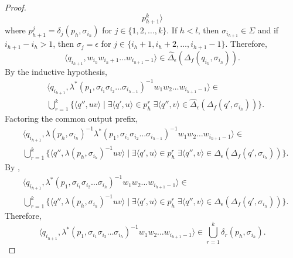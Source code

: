 \begin{proof}
\begin{equation*}
    p_{h+1}^k \rangle
  \end{equation*}
  where $p_{h+1}^j = \delta_j(p_h, \sigma_{i_h})$ for $j \in \{ 1, 2, \ldots, k \}$.
  If $h < l$, then $\sigma_{i_{h+1}} \in \Sigma$ and if $i_{h+1} - i_h > 1$, then
  $\sigma_j = \epsilon$ for $j \in \{ i_h+1, i_h+2, \ldots, i_{h+1}-1 \}$.
  Therefore,
  \begin{equation*}
    \langle q_{i_{h+1}}, w_{i_h} w_{i_h+1} \ldots w_{i_{h+1}-1} \rangle \in
    \hat{\Delta}_\epsilon(\Delta_f(q_{i_h}, \sigma_{i_h})).
  \end{equation*}
  By the inductive hypothesis,
  \begin{align*}
    &\langle q_{i_{h+1}}, \lambda^*(p_1, \sigma_{i_1} \sigma_{i_2} \ldots
    \sigma_{i_{h-1}})^{-1} w_1 w_2 \ldots w_{i_{h+1}-1} \rangle \in\\
    &\bigcup_{r=1}^k \{ \langle q'', uv \rangle \mid \exists \langle q', u \rangle
    \in p_h^r \; \exists \langle q'', v \rangle \in
    \hat{\Delta}_\epsilon(\Delta_f(q', \sigma_{i_h})) \}.
  \end{align*}
  Factoring the common output prefix,
  \begin{align*}
    &\langle q_{i_{h+1}}, \lambda(p_h, \sigma_{i_h})^{-1} \lambda^*(p_1,
    \sigma_{i_1} \sigma_{i_2} \ldots
    \sigma_{i_{h-1}})^{-1} w_1 w_2 \ldots w_{i_{h+1}-1} \rangle \in\\
    &\bigcup_{r=1}^k \{ \langle q'', \lambda(p_h, \sigma_{i_h})^{-1} uv \rangle \mid
    \exists \langle q', u \rangle \in p_h^r \; \exists \langle q'', v \rangle \in
    \hat{\Delta}_\epsilon(\Delta_f(q', \sigma_{i_h})) \}.
  \end{align*}
  By ,
  \begin{align*}
    &\langle q_{i_{h+1}}, \lambda^*(p_1, \sigma_{i_1} \sigma_{i_2} \ldots
    \sigma_{i_h})^{-1} w_1 w_2 \ldots w_{i_{h+1}-1} \rangle \in\\
    &\bigcup_{r=1}^k \{ \langle q'', \lambda(p_h, \sigma_{i_h})^{-1} uv \rangle \mid
    \exists \langle q', u \rangle \in p_h^r \; \exists \langle q'', v \rangle \in
    \hat{\Delta}_\epsilon(\Delta_f(q', \sigma_{i_h})) \}.
  \end{align*}
  Therefore,
  \begin{equation*}
    \langle q_{i_{h+1}}, \lambda^*(p_1, \sigma_{i_1} \sigma_{i_2} \ldots
    \sigma_{i_h})^{-1} w_1 w_2 \ldots w_{i_{h+1}-1} \rangle \in
    \bigcup_{r=1}^k \delta_r(p_h, \sigma_{i_h}).
  \end{equation*}
\end{proof}

